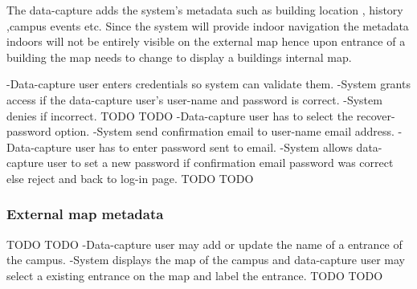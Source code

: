 The data-capture adds the system's metadata such as building location , history ,campus events etc.
Since the system will provide indoor navigation the metadata indoors will not be entirely visible on the external map hence upon entrance of a building the map needs to change to display a buildings internal map.

	  	{-Data-capture user enters credentials so system can validate them.
	 	-System grants access if the data-capture user's user-name and password is correct.
	 	-System denies if incorrect.}
                  {TODO}
                  {TODO}
		{-Data-capture user has to select the recover-password option.
		-System send confirmation email to user-name email address.
		-Data-capture user has to enter password sent to email.
	  	-System allows data-capture user to set a new password if confirmation email password was correct else reject and back                    to log-in page.}
                {TODO}
                {TODO}               
\subsubsection {External map  metadata }
          {TODO}
          {TODO}
         {-Data-capture user may add or update the name of a entrance of the campus.}
         {-System displays the map of the campus and data-capture user may select a existing entrance on the map and label the entrance.
         }
         {TODO}
         {TODO}
